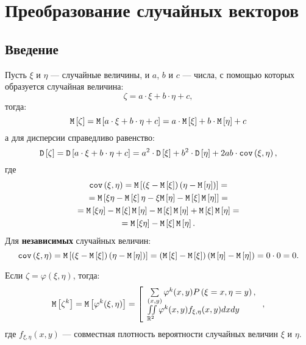 \chapter{Преобразование случайных векторов}

\section*{Введение}
Пусть $\xi$ и $\eta$ --- случайные величины, и $a$, $b$ и $c$ --- числа, с помощью которых образуется случайная величина:
\begin{equation}
    \zeta = a \cdot \xi + b \cdot \eta + c,
\end{equation}
тогда:
\begin{equation}
    \mathtt{M} \left [ \zeta \right ]
    = \mathtt{M} \left [ a \cdot \xi + b \cdot \eta + c \right ]
    = a \cdot \mathtt{M} \left [ \xi \right ] + b \cdot \mathtt{M} \left [ \eta \right ] + c
\end{equation}
а для дисперсии справедливо равенство:
\begin{equation}
    \mathtt{D} \left [ \zeta \right ]
    = \mathtt{D} \left [ a \cdot \xi + b \cdot \eta + c \right ]
    = a^2 \cdot \mathtt{D} \left [ \xi \right ] + b^2 \cdot \mathtt{D} \left [ \eta \right ] + 2 a b \cdot \texttt{cov} \left ( \xi , \eta \right ),
\end{equation}
где
\begin{multline}
    \label{10:covariance}
    \texttt{cov} \left ( \xi , \eta \right )
    = \mathtt{M} \left [ \left ( \xi - \mathtt{M} \left [ \xi \right ] \right ) \left ( \eta - \mathtt{M} \left [ \eta \right ] \right ) \right ] = \\
    = \mathtt{M} \left [  \xi \eta - \mathtt{M} \left [ \xi \right ] \eta - \xi \mathtt{M} \left [ \eta \right ] - \mathtt{M} \left [ \xi \right ] \mathtt{M} \left [ \eta \right ] \right ] = \\
    = \mathtt{M} \left [ \xi\eta \right ] - \mathtt{M} \left [ \xi \right ] \mathtt{M} \left [ \eta \right ] - \mathtt{M} \left [ \xi \right ] \mathtt{M} \left [ \eta \right ] + \mathtt{M} \left [ \xi \right ] \mathtt{M} \left [ \eta \right ] = \\
    = \mathtt{M} \left [ \xi\eta \right ] - \mathtt{M} \left [ \xi \right ] \mathtt{M} \left [ \eta \right ].
\end{multline}
Для \textbf{независимых} случайных величин:
\begin{equation}
    \texttt{cov} \left ( \xi , \eta \right )
    = \mathtt{M} \left [ \left ( \xi - \mathtt{M} \left [ \xi \right ] \right ) \left ( \eta - \mathtt{M} \left [ \eta \right ] \right ) \right ]
    = \left ( \mathtt{M} \left [ \xi \right ] - \mathtt{M} \left [ \xi \right ] \right ) \left ( \mathtt{M} \left [ \eta \right ] - \mathtt{M} \left [ \eta \right ] \right )
    = 0 \cdot 0
    = 0 .
\end{equation}

Если $\zeta = \varphi(\xi, \eta)$, тогда:
\begin{equation}
    \mathtt{M} \left [ \zeta^k \right ]
    = \mathtt{M} \left [ \varphi^k(\xi, \eta) \right ]
    = \left [
            \begin{array}{l}
                \sum \limits_{(x, y)} \varphi^k(x,y) P \left ( \xi = x, \eta = y \right ) , \\
                \iint \limits_{\mathbb{R}^2} \varphi^k(x,y) f_{\xi, \eta}(x,y) dx dy
            \end{array}
    \right .
    ,
\end{equation}
где $f_{\xi,\eta}(x,y)$ --- совместная плотность вероятности случайных величин $\xi$ и $\eta$.

